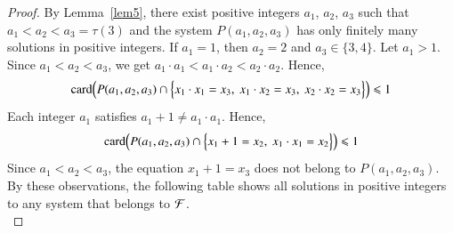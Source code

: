 \documentclass[conference]{IEEEtran}
\begin{document}
\begin{proof}
By Lemma~\ref{lem5}, there exist positive integers $a_1$, $a_2$, $a_3$ such that \mbox{$a_1<a_2<a_3=\tau(3)$}
and the system \mbox{$P(a_1,a_2,a_3)$} has only finitely many solutions in positive integers.
If \mbox{$a_1=1$}, then \mbox{$a_2=2$} and \mbox{$a_3 \in \{3,4\}$}. Let \mbox{$a_1>1$}.
Since \mbox{$a_1<a_2<a_3$}, we get \mbox{$a_1 \cdot a_1<a_1 \cdot a_2<a_2 \cdot a_2$}. Hence,
\[
{\rm card}\Bigl(P(a_1,a_2,a_3) \cap \Bigl\{x_1 \cdot x_1=x_3,~x_1 \cdot x_2=x_3,~x_2 \cdot x_2=x_3\Bigr\}\Bigr) \leqslant 1
\]
Each integer $a_1$ satisfies \mbox{$a_1+1 \neq a_1 \cdot a_1$}. Hence,
\[
{\rm card}\Bigl(P(a_1,a_2,a_3) \cap \Bigl\{x_1+1=x_2,~x_1 \cdot x_1=x_2\Bigr\}\Bigr) \leqslant 1
\]
Since \mbox{$a_1<a_2<a_3$}, the equation \mbox{$x_1+1=x_3$} does not belong to \mbox{$P(a_1,a_2,a_3)$}.
By these observations, the following table shows all solutions in positive integers to any system that
belongs to ${\cal F}$.\\
\newpage
\begin{table}[ht!]


\end{table}
\end{proof}
\end{document}
